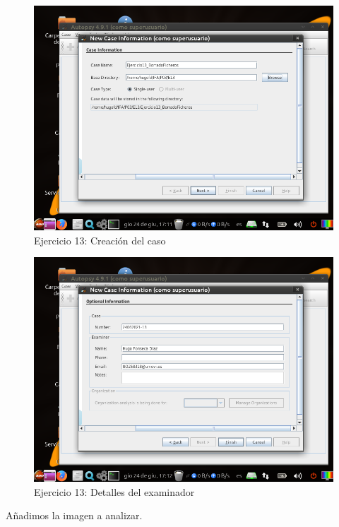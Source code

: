 \documentclass[11pt]{article}
\begin{document}
\begin{figure}[H]
    \caption{Ejercicio 13: Creación del caso}
    \centering
    \includegraphics[scale=0.7]{e13-1.png}
\end{figure}

\begin{figure}[H]
    \caption{Ejercicio 13: Detalles del examinador}
    \centering
    \includegraphics[scale=0.7]{e13-2.png}
\end{figure}

Añadimos la imagen a analizar.
\end{document}
